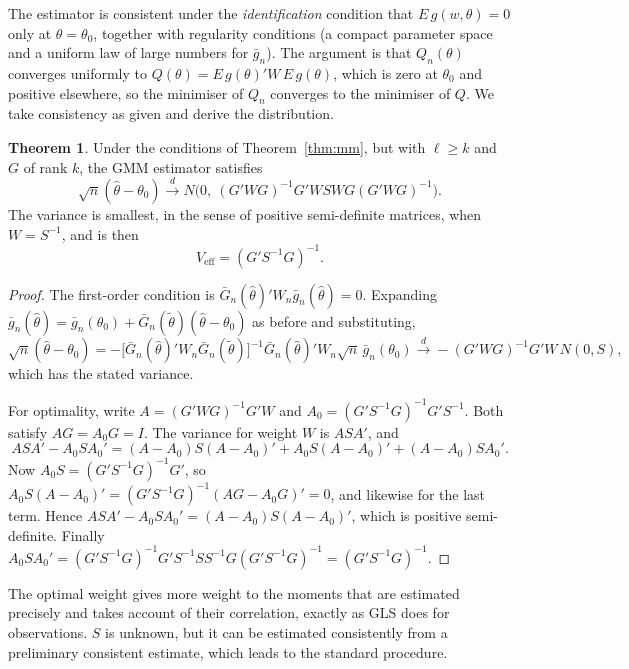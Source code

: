 \documentclass[11pt,a4paper]{article}
\numberwithin{equation}{section}
\theoremstyle{definition}
\newtheorem{thm}{Theorem}[subsection]
\begin{document}
The estimator is consistent under the \emph{identification} condition that $E\,g(w, \theta) = 0$ only at $\theta = \theta_0$, together with regularity conditions (a compact
parameter space and a uniform law of large numbers for $\bar g_n$). The argument is that $Q_n(\theta)$ converges uniformly to $Q(\theta) = E\,g(\theta)'W\,E\,g(\theta)$, which is zero at $\theta_0$
and positive elsewhere, so the minimiser of $Q_n$ converges to the minimiser of $Q$. We take consistency as given and derive the distribution.

\begin{thm}
\label{thm:gmm}
Under the conditions of Theorem~\ref{thm:mm}, but with $\ell \geq k$ and $G$ of rank $k$, the GMM estimator satisfies
\[
\sqrt n(\hat\theta - \theta_0) \xrightarrow{d} N\bigl(0,\ (G'WG)^{-1}G'WSWG(G'WG)^{-1}\bigr) .
\]
The variance is smallest, in the sense of positive semi-definite matrices, when $W = S^{-1}$, and is then
\[
V_{\text{eff}} = (G'S^{-1}G)^{-1} .
\]
\end{thm}

\begin{proof}
The first-order condition is $\bar G_n(\hat\theta)'W_n\bar g_n(\hat\theta) = 0$. Expanding $\bar g_n(\hat\theta) = \bar g_n(\theta_0) + \bar G_n(\tilde\theta)(\hat\theta - \theta_0)$ as before and substituting,
\[
\sqrt n(\hat\theta - \theta_0) = -\bigl[\bar G_n(\hat\theta)'W_n\bar G_n(\tilde\theta)\bigr]^{-1}\bar G_n(\hat\theta)'W_n\sqrt n\,\bar g_n(\theta_0) \xrightarrow{d} -(G'WG)^{-1}G'W\,N(0, S),
\]
which has the stated variance.

For optimality, write $A = (G'WG)^{-1}G'W$ and $A_0 = (G'S^{-1}G)^{-1}G'S^{-1}$. Both satisfy $AG = A_0G = I$. The variance for weight $W$ is $ASA'$, and
\[
ASA' - A_0SA_0' = (A - A_0)S(A - A_0)' + A_0S(A - A_0)' + (A - A_0)SA_0' .
\]
Now $A_0S = (G'S^{-1}G)^{-1}G'$, so $A_0S(A - A_0)' = (G'S^{-1}G)^{-1}(AG - A_0G)' = 0$, and likewise for the last term. Hence $ASA' - A_0SA_0' = (A - A_0)S(A - A_0)'$, which is
positive semi-definite. Finally $A_0SA_0' = (G'S^{-1}G)^{-1}G'S^{-1}SS^{-1}G(G'S^{-1}G)^{-1} = (G'S^{-1}G)^{-1}$.
\end{proof}

The optimal weight gives more weight to the moments that are estimated precisely and takes account of their correlation, exactly as GLS does for
observations. $S$ is unknown, but it can be estimated consistently from a preliminary consistent estimate, which leads to the standard procedure.
\end{document}
